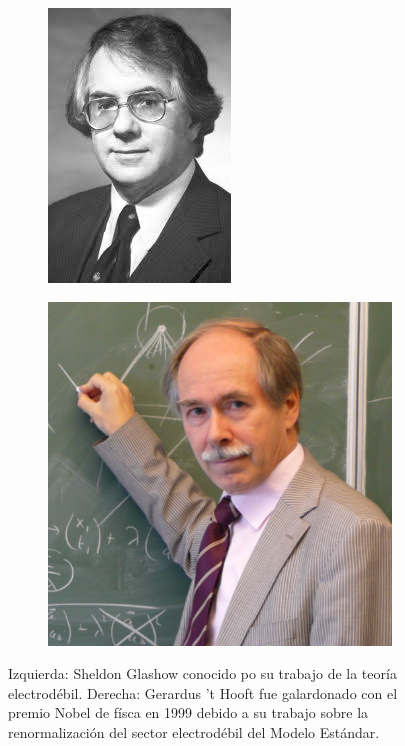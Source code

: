 \begin{figure}
\centering
\begin{subfigure}{0.5\textwidth}
\centering
\includegraphics[scale=0.45]{images/glashow.jpeg}
\end{subfigure}\begin{subfigure}{0.5\textwidth}
\centering
\includegraphics[scale=0.25]{images/thooft.jpg}
\end{subfigure}
\caption{Izquierda: Sheldon Glashow conocido po su trabajo de la teor\'ia electrod\'ebil. Derecha: Gerardus 't Hooft fue galardonado con el premio Nobel de f\'isca en 1999 debido a su trabajo sobre la renormalizaci\'on del sector electrod\'ebil del Modelo Est\'andar.}
\end{figure}

